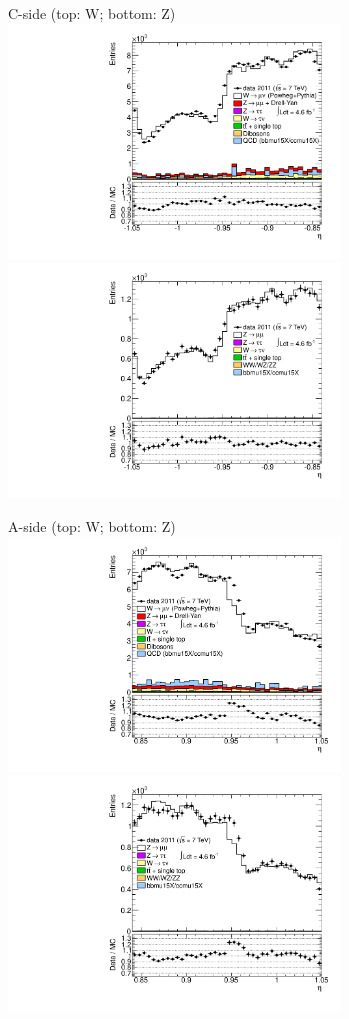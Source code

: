 {

\colb[T]

C-side (top: W; bottom: Z)
\centering
\includegraphics[width=0.66\textwidth]{dates/20130306/figures/etaphi/W_5_C_stack_l_eta_NEG} \\
\includegraphics[width=0.66\textwidth]{dates/20130306/figures/etaphi/Z_5_C_stack_lN_eta_ALL.pdf}

A-side (top: W; bottom: Z)
\centering
\includegraphics[width=0.66\textwidth]{dates/20130306/figures/etaphi/W_5_A_stack_l_eta_NEG} \\
\includegraphics[width=0.66\textwidth]{dates/20130306/figures/etaphi/Z_5_A_stack_lN_eta_ALL.pdf} 

\cole
}


